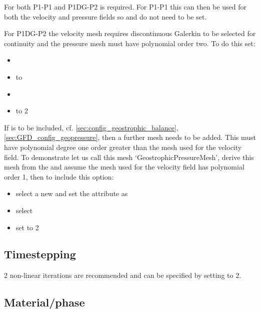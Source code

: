For both P1-P1 and P1DG-P2  is required. For P1-P1 this can then be used for both the velocity and pressure fields so  and  do not need to be set.

For P1DG-P2 the velocity mesh requires discontinuous Galerkin to be selected for continuity and the pressure mesh must have polynomial order two. To do this set:
\begin{itemize}
\item {}
\item {} to 
\item {}
\item {} to 2
\end{itemize}

If  is to be included, cf. \ref{sec:config_geostrophic_balance}, \ref{sec:GFD_config_geopressure}, then a further mesh needs to be added. This must have polynomial degree one order greater than the mesh used for the velocity field. To demonstrate let us call this mesh `GeostrophicPressureMesh', derive this mesh from the  and assume the mesh used for the velocity field has polynomial order 1, then to include this option:
\begin{itemize}
\item select a new  and set the  attribute as 
\item select 
\item set  to 2
\end{itemize}

\subsection{Timestepping}

2 non-linear iterations are recommended and can be specified by setting  to 2.

\subsection{Material/phase}


